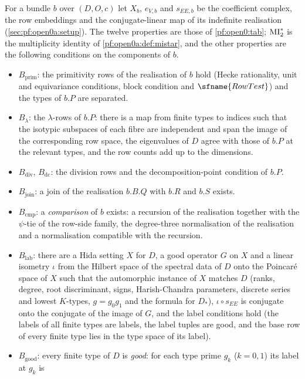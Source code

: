 \begin{definition}\label{pf:open0:def:twelve}
For a bundle $b$ over $(D,O,c)$ let $X_b$, $e_{V,b}$ and $s_{EE,b}$ be the coefficient complex, the row embeddings and the
conjugate-linear map of its indefinite realisation (\cref{sec:pf:open0a:setup}). The twelve properties are those of
\cref{pf:open0:tab}; $\mathrm{MI}^{*}_{2}$ is the multiplicity identity of \cref{pf:open0a:def:mistar}, and the other
properties are the following conditions on the components of $b$.
\begin{itemize}
\item $B_{\mathrm{prim}}$: the primitivity rows of the realisation of $b$ hold (Hecke rationality, unit and equivariance
conditions, block condition and $\sfname{RowTest}$) and the types of $b.P$ are separated.
\item $B_\lambda$: the $\lambda$-rows of $b.P$: there is a map from finite types to indices such that the isotypic
subspaces of each fibre are independent and span the image of the corresponding row space, the eigenvalues of $D$ agree
with those of $b.P$ at the relevant types, and the row counts add up to the dimensions.
\item $B_{\mathrm{div}}$, $B_{\mathrm{dc}}$: the division rows and the decomposition-point condition of $b.P$.
\item $B_{\mathrm{join}}$: a join of the realisation $b.B.Q$ with $b.R$ and $b.S$ exists.
\item $B_{\mathrm{cmp}}$: a \emph{comparison} of $b$ exists: a recursion of the realisation together with the
$\psi$-tie of the row-side family, the degree-three normalisation of the realisation and a normalisation compatible
with the recursion.
\item $B_{\mathrm{lab}}$: there are a Hida setting $X$ for $D$, a good operator $G$ on $X$ and a linear isometry $\iota$ from
the Hilbert space of the spectral data of $D$ onto the Poincar\'e space of $X$ such that the automorphic instance of
$X$ matches $D$ (ranks, degree, root discriminant, signs, Harish-Chandra parameters, discrete series and lowest
$K$-types, $g=g_0g_1$ and the formula for $D_*$), $\iota\circ s_{EE}$ is conjugate onto the conjugate of the image of $G$,
and the label conditions hold (the labels of all finite types are labels, the label tuples are good, and the base row of
every finite type lies in the type space of its label).
\item $B_{\mathrm{good}}$: every finite type of $D$ is \emph{good}: for each type prime $g_k$ ($k=0,1$) its label at $g_k$ is

\end{itemize}
\end{definition}
